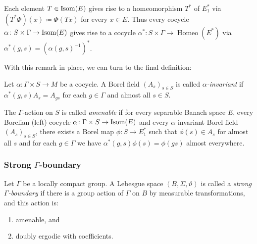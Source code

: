 \begin{rem}
  Each element \(T \in \operatorname{Isom}(E)\) gives rise to a homeomorphism \(T^\ast\) of \(E^\ast_1\) via \((T^\ast\Phi)(x) \coloneqq \Phi(Tx)\) for every \(x \in E\). Thus every cocycle \(\alpha \colon S \times \Gamma \to \operatorname{Isom}(E)\) gives rise to a cocycle \(\alpha^\ast \colon S \times \Gamma \to \operatorname{Homeo}(E^\ast)\) via \(\alpha^\ast (g, s) = (\alpha(g, s)^{-1})^\ast\).
\end{rem}

With this remark in place, we can turn to the final definition:

\begin{defin}
  Let \(\alpha\colon \Gamma \times S \to M\) be a cocycle. A Borel field \((A_s)_{s \in S}\) is called \emph{\(\alpha\)-invariant} if \(\alpha^\ast(g, s) A_{s} = A_{gs}\) for each \(g \in \Gamma\) and almost all \(s \in S\).

  The \(\Gamma\)-action on \(S\) is called \emph{amenable} if for every separable Banach space \(E\), every Borelian (left) cocycle \(\alpha \colon \Gamma \times S \to \operatorname{Isom}(E)\) and every \(\alpha\)-invariant Borel field \((A_s)_{s \in S}\), there exists a Borel map \(\phi \colon S \to E^\ast_1\) such that \(\phi(s) \in A_s\) for almost all \(s\) and for each \(g \in \Gamma\) we have \(\alpha^\ast(g, s) \phi(s) = \phi(gs)\) almost everywhere.
\end{defin}

\subsubsection*{Strong \(\Gamma\)-boundary}
\label{str-bdry}

\begin{defin}
  Let \(\Gamma\) be a locally compact group. A Lebesgue space \((B, \Sigma, \vartheta)\) is called a \emph{strong \(\Gamma\)-boundary} if there is a group action of \(\Gamma\) on \(B\) by measurable transformations, and this action is:
  \begin{enumerate}
  \item amenable, and
  \item doubly ergodic with coefficients.
  \end{enumerate}
\end{defin}

